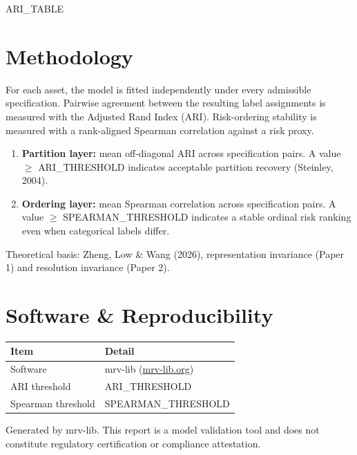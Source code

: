 \documentclass[11pt,a4paper]{article}
\begin{document}
\medskip
{}

\medskip
\begin{center}
{{ARI_TABLE}}
\end{center}


\newpage
\section{Methodology}

For each asset, the model is fitted independently under every admissible
specification. Pairwise agreement between the resulting label assignments is
measured with the Adjusted Rand Index (ARI).
Risk-ordering stability is
measured with a rank-aligned Spearman correlation against a risk proxy.

\begin{enumerate}[leftmargin=2em]
\item \textbf{Partition layer:} mean off-diagonal ARI across specification
      pairs. A value $\geq$ {{ARI_THRESHOLD}} indicates acceptable partition
      recovery (Steinley, 2004).
\item \textbf{Ordering layer:} mean Spearman correlation across specification
      pairs. A value $\geq$ {{SPEARMAN_THRESHOLD}} indicates a stable ordinal
      risk ranking even when categorical labels differ.
\end{enumerate}

\noindent
Theoretical basis: Zheng, Low \& Wang (2026), representation invariance
(Paper 1) and resolution invariance (Paper 2).


\newpage
\appendix

\section{Software \& Reproducibility}

\begin{table}[H]
\centering
\begin{tabularx}{\textwidth}{l X}
\toprule
\textbf{Item} & \textbf{Detail} \\
\midrule
Software           & mrv-lib (\href{https://mrv-lib.org}{mrv-lib.org}) \\
ARI threshold      & {{ARI_THRESHOLD}} \\
Spearman threshold & {{SPEARMAN_THRESHOLD}} \\
\bottomrule
\end{tabularx}
\end{table}

\vfill
\begin{center}
\footnotesize\textcolor{mrvgray}{
Generated by mrv-lib.
This report is a model validation tool and does not constitute
regulatory certification or compliance attestation.
}
\end{center}
\end{document}
